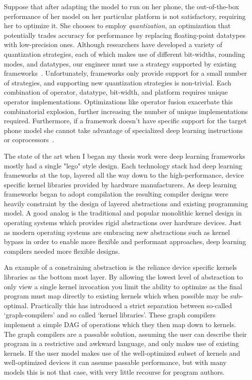 Suppose that after adapting the model to run on her phone,
  the out-of-the-box performance of her
  model on her particular platform is not satisfactory, requiring her to optimize it.
She chooses to employ \textit{quantization}, an optimization that
  potentially trades accuracy for performance by replacing
  floating-point datatypes with low-precision ones.
Although researchers have developed a variety of quantization
  strategies, each of which makes use of different bit-widths, rounding
  modes, and datatypes, our engineer must use a strategy supported
  by existing frameworks~\citep{gustafson2015end, tf_lite_ops_compat, glow_quant}.
Unfortunately, frameworks only provide support for a small number
  of strategies, and supporting new quantization strategies is non-trivial.
Each combination of operator, datatype, bit-width, and
  platform requires unique operator implementations.
Optimizations like operator fusion exacerbate this combinatorial explosion,
  further increasing the number of unique implementations required.
Furthermore, if a framework doesn't have specific support for
  the target phone model she cannot take advantage of specialized deep learning
  instructions or coprocessors~\citep{apple_neural_engine}.

The state of the art when I began my thesis work were
  deep learning frameworks mostly had a single "lego" style design.
Each technology stack had deep learning frameworks at the top,
  layered all the way down to the high-performance,
  device specific kernel libraries provided by hardware manufacturers.
As deep learning frameworks began to adopt compilation
  the resulting compiler designs were heavily constraint by the
  design of layered abstractions and existing programming model.
A good analog is the traditional and popular monolithic kernel design
  in operating systems which provides rigid abstractions over
  hardware devices.
Just as modern operating systems are embracing new abstractions
  such as kernel bypass in order to enable more flexible and
  performant approaches, deep learning compilers needed more
  flexible designs.

An example of a constraining abstraction is the reliance
  device specific kernels libraries as the bottom most layer.
By allowing the lowest level of abstraction to only view a single
  kernel invocation you limit the ability to optimize as the final
  program must map directly to existing kernels which when possible
  may be sub-optimal.
Practically this has introduced a strict separation between so-called
  ‘graph-compilers’ and so called ‘kernel libraries’.
These graph compilers implement a simple DAG of operations
  which they then map down to kernels.
The graph compilers are a passable solution, assuming the user can describe their program
  in a restrictive and awkward language, and only makes use of existing kernels.
If the user model makes use of the well-optimized subset of kernels and well-optimized devices
  it can assume passable performance, but with many models this is not that case, with very little recourse for program authors.

